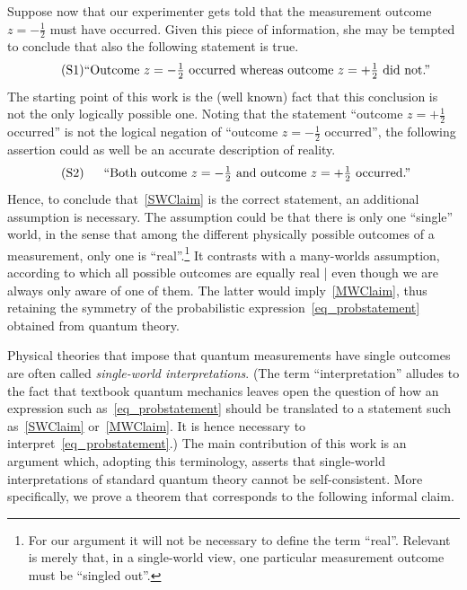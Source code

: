 \documentclass{article}
\theoremstyle{plain}
\theoremstyle{definition}
\newcommand*{\sminus}{{\textstyle - \frac{1}{2}}}
\newcommand*{\splus}{{\textstyle + \frac{1}{2}}}
\newcommand*{\mclaim}[1]{\begin{minipage}{0.8\textwidth} \begin{center}  #1 \end{center}\end{minipage}}
\begin{document}
Suppose now that our experimenter gets told that the measurement outcome~$z = \sminus$ must have occurred. Given this piece of information, she may be tempted to conclude that also the following statement is true. 
\begin{align}
 \label{SWClaim} \tag{S1} \mclaim{``Outcome~$z = \sminus$ occurred whereas outcome~$z = \splus$ did not.''}
\end{align}
The starting point of this work is the (well known) fact that this conclusion is not the only logically possible one. Noting that the statement ``outcome $z = \splus$ occurred'' is not the logical negation of ``outcome $z = \sminus$ occurred'', the following assertion could as well be an accurate description of reality.
  \begin{align}
 \label{MWClaim} \tag{S2} \mclaim{``Both outcome~$z = \sminus$ and outcome~$z = \splus$ occurred.''} 
\end{align}
Hence, to conclude that~\eqref{SWClaim} is the correct statement, an additional assumption is necessary. The assumption could be that there is only one ``single'' world, in the sense that among the different physically possible outcomes of a measurement, only one is ``real''.\footnote{For our argument it will not be necessary to define the term ``real''.  Relevant is merely that, in a single-world view, one particular measurement outcome must be ``singled out''.}  It contrasts with a many-worlds assumption, according to which all possible outcomes are equally real | even though we are always only aware of one of them.  The latter would imply~\eqref{MWClaim}, thus retaining the symmetry of the probabilistic expression~\eqref{eq_probstatement} obtained from quantum theory.

Physical theories that impose that quantum measurements have single outcomes are often called \emph{single-world interpretations}. (The term ``interpretation'' alludes to the fact that textbook quantum mechanics leaves open the question of how an expression such as~\eqref{eq_probstatement} should be translated to a statement such as~\eqref{SWClaim} or~\eqref{MWClaim}. It is hence necessary to interpret~\eqref{eq_probstatement}.)  The main contribution of this work is an argument which, adopting this terminology, asserts that single-world interpretations of standard quantum theory cannot be self-consistent.  More specifically, we prove a theorem that corresponds to the following informal claim. 
\end{document}
